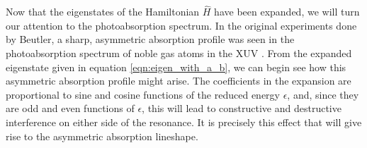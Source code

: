Now that the eigenstates of the Hamiltonian $\hat{H}$ have been expanded, we will turn our attention to the photoabsorption spectrum.  In the original experiments done by Beutler, a sharp, asymmetric absorption profile was seen in the photoabsorption spectrum of noble gas atoms in the XUV \cite{beutlerUeberAbsorptionsserienArgon1935}.  From the expanded eigenstate given in equation \ref{eqn:eigen_with_a_b}, we can begin see how this asymmetric absorption profile might arise.  The coefficients in the expansion are proportional to sine and cosine functions of the reduced energy $\epsilon$, and, since they are odd and even functions of $\epsilon$, this will lead to constructive and destructive interference on either side of the resonance.  It is precisely this effect that will give rise to the asymmetric absorption lineshape.

